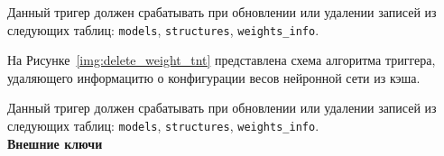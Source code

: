 Данный тригер должен срабатывать при обновлении или удалении записей из следующих таблиц: \texttt{models}, \texttt{structures}, \texttt{weights\_info}.

\newpage

На Рисунке~\ref{img:delete_weight_tnt} представлена схема алгоритма триггера, удаляющего информацитю о конфигурации весов нейронной сети из кэша.


Данный тригер должен срабатывать при обновлении или удалении записей из следующих таблиц: \texttt{models}, \texttt{structures}, \texttt{weights\_info}.\\

\noindent\textbf{Внешние ключи}\\

